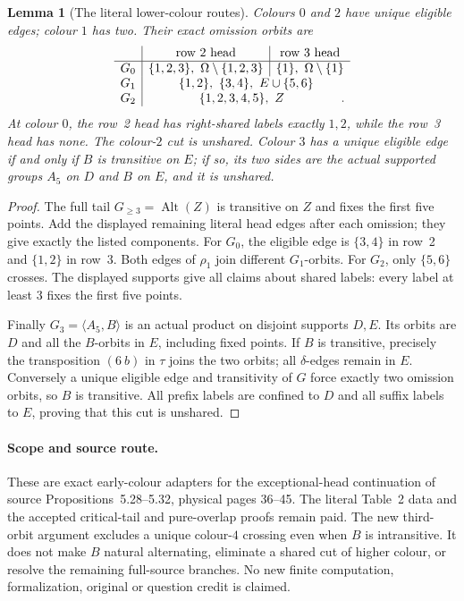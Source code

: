 \documentclass[11pt,a4paper]{article}
\newtheorem{lemma}{Lemma}
\newcommand{\gen}[1]{\langle#1\rangle}
\newcommand{\Alt}{\operatorname{Alt}}
\begin{document}
\begin{lemma}[The literal lower-colour routes]
Colours $0$ and $2$ have unique eligible edges; colour $1$ has
two. Their exact omission orbits are
\[
\begin{array}{c|c|c}
 &\text{row 2 head}&\text{row 3 head}\\ \hline
G_0&\{1,2,3\},\ \Omega\setminus\{1,2,3\}
    &\{1\},\ \Omega\setminus\{1\}\\
G_1&\multicolumn{2}{c}{\{1,2\},\ \{3,4\},\ E\cup\{5,6\}}\\
G_2&\multicolumn{2}{c}{\{1,2,3,4,5\},\ Z}.
\end{array}
\]
At colour $0$, the row~2 head has right-shared labels exactly
$1,2$, while the row~3 head has none. The colour-$2$ cut is
unshared. Colour $3$ has a unique eligible edge if and only if
$B$ is transitive on $E$; if so, its two sides are the actual
supported groups $A_5$ on $D$ and $B$ on $E$, and it is unshared.
\end{lemma}
\begin{proof}
The full tail $G_{\ge3}=\Alt(Z)$ is transitive on $Z$ and fixes
the first five points. Add the displayed remaining literal head
edges after each omission; they give exactly the listed components.
For $G_0$, the eligible edge is $\{3,4\}$ in row~2 and
$\{1,2\}$ in row~3. Both edges of $\rho_1$ join different
$G_1$-orbits. For $G_2$, only $\{5,6\}$ crosses.
The displayed supports give all claims about shared labels:
every label at least $3$ fixes the first five points.

Finally $G_3=\gen{A_5,B}$ is an actual product on disjoint
supports $D,E$. Its orbits are $D$ and all the $B$-orbits in
$E$, including fixed points. If $B$ is transitive, precisely
the transposition $(6\ b)$ in $\tau$ joins the two orbits;
all $\delta$-edges remain in $E$. Conversely a unique eligible
edge and transitivity of $G$ force exactly two omission orbits,
so $B$ is transitive. All prefix labels are confined to $D$
and all suffix labels to $E$, proving that this cut is unshared.
\end{proof}

\paragraph{Scope and source route.}
These are exact early-colour adapters for the exceptional-head
continuation of source Propositions~5.28--5.32, physical pages
36--45. The literal Table~2 data and the accepted critical-tail
and pure-overlap proofs remain paid. The new third-orbit argument
excludes a unique colour-$4$ crossing even when $B$ is intransitive.
It does not make $B$ natural alternating, eliminate a shared cut
of higher colour, or resolve the remaining full-source branches.
No new finite computation, formalization, original or question
credit is claimed.
\end{document}
